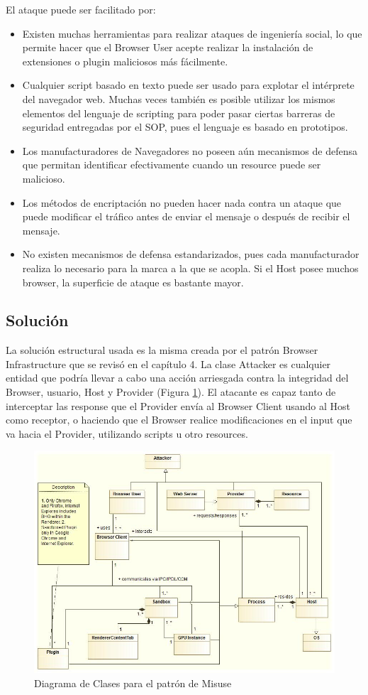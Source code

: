El ataque puede ser facilitado por:
\begin{itemize}
	\item Existen muchas herramientas para realizar ataques de ingeniería social, lo que permite hacer que el Browser User acepte realizar la instalación de extensiones o plugin maliciosos más fácilmente.
	\item Cualquier script basado en texto puede ser usado para explotar el intérprete del navegador web. Muchas veces también es posible utilizar los mismos elementos del lenguaje de scripting para poder pasar ciertas barreras de seguridad entregadas por el SOP, pues el lenguaje es basado en prototipos. 
	\item Los manufacturadores de Navegadores no poseen aún mecanismos de defensa que permitan identificar efectivamente cuando un resource puede ser malicioso.
	\item Los métodos de encriptación no pueden hacer nada contra un ataque que puede modificar el tráfico antes de enviar el mensaje o después de recibir el mensaje.
	\item No existen mecanismos de defensa estandarizados, pues cada manufacturador realiza lo necesario para la marca a la que se acopla. Si el Host posee muchos browser, la superficie de ataque es bastante mayor.
\end{itemize}
\subsection{Solución}
La solución estructural usada es la misma creada por el patrón Browser Infrastructure que se revisó en el capítulo 4. La clase Attacker es cualquier entidad que podría llevar a cabo una acción arriesgada contra la integridad del Browser, usuario, Host y Provider (Figura \ref{fig:BIMisuse}). El atacante es capaz tanto de interceptar las response que el Provider envía al Browser Client usando al Host como receptor, o haciendo que el Browser realice modificaciones en el input que va hacia el Provider, utilizando scripts u otro resources.
\begin{figure}[h]
	        \centering
	        \includegraphics[scale=0.45]{figures/chap5/patronMisuse.jpg}
	        \caption{Diagrama de Clases para el patrón de Misuse}
	        \label{fig:BIMisuse}
    \end{figure}

